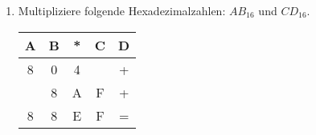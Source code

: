 \documentclass{article}
\begin{document}
\begin{enumerate}
\clearpage

\item Multipliziere folgende Hexadezimalzahlen: $AB_{16}$ und $CD_{16}$.

\begin{center}
\begin{tabular}{ c c c c c }
    A & B & * & C & D \\
    \hline
    8 & 0 & 4 &   & +\\
      & 8 & A & F & + \\
    \hline\hline
    8 & 8 & E & F & =
\end{tabular}
\end{center}

\end{enumerate}
\end{document}
